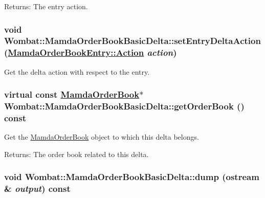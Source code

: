 \begin{Desc}
\item[Returns:]The entry action. \end{Desc}
\hypertarget{classWombat_1_1MamdaOrderBookBasicDelta_a891db48e540e1c71fc2fb11552e8e95}{
\subsubsection[setEntryDeltaAction]{\setlength{\rightskip}{0pt plus 5cm}void Wombat::Mamda\-Order\-Book\-Basic\-Delta::set\-Entry\-Delta\-Action (\hyperlink{classWombat_1_1MamdaOrderBookEntry_fc6cb1d67c7601d093a36f59cf9bcef4}{Mamda\-Order\-Book\-Entry::Action} {\em action})}}
\label{classWombat_1_1MamdaOrderBookBasicDelta_a891db48e540e1c71fc2fb11552e8e95}


Get the delta action with respect to the entry. 

\hypertarget{classWombat_1_1MamdaOrderBookBasicDelta_9fb6ae94903535161a689fce7dc7cc4d}{
\subsubsection[getOrderBook]{\setlength{\rightskip}{0pt plus 5cm}virtual const \hyperlink{classWombat_1_1MamdaOrderBook}{Mamda\-Order\-Book}$\ast$ Wombat::Mamda\-Order\-Book\-Basic\-Delta::get\-Order\-Book () const}}
\label{classWombat_1_1MamdaOrderBookBasicDelta_9fb6ae94903535161a689fce7dc7cc4d}


Get the \hyperlink{classWombat_1_1MamdaOrderBook}{Mamda\-Order\-Book} object to which this delta belongs. 

\begin{Desc}
\item[Returns:]The order book related to this delta. \end{Desc}
\hypertarget{classWombat_1_1MamdaOrderBookBasicDelta_f3387069184400eb065fb59bf27b2812}{
\subsubsection[dump]{\setlength{\rightskip}{0pt plus 5cm}void Wombat::Mamda\-Order\-Book\-Basic\-Delta::dump (ostream \& {\em output}) const}}
\label{classWombat_1_1MamdaOrderBookBasicDelta_f3387069184400eb065fb59bf27b2812}


